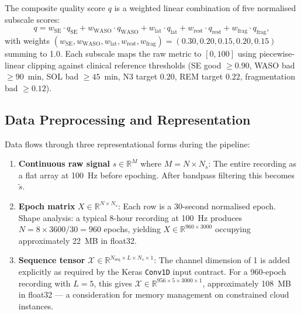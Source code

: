 \documentclass[10pt]{article}
\begin{document}
The composite quality score $q$ is a weighted linear combination of five normalised subscale scores:
\begin{equation}
  q = w_{\text{SE}} \cdot q_{\text{SE}} + w_{\text{WASO}} \cdot q_{\text{WASO}} + w_{\text{lat}} \cdot q_{\text{lat}} + w_{\text{rest}} \cdot q_{\text{rest}} + w_{\text{frag}} \cdot q_{\text{frag}},
\end{equation}
with weights $(w_{\text{SE}}, w_{\text{WASO}}, w_{\text{lat}}, w_{\text{rest}}, w_{\text{frag}}) = (0.30, 0.20, 0.15, 0.20, 0.15)$ summing to 1.0. Each subscale maps the raw metric to $[0, 100]$ using piecewise-linear clipping against clinical reference thresholds (SE good $\geq 0.90$, WASO bad $\geq 90$~min, SOL bad $\geq 45$~min, N3 target $0.20$, REM target $0.22$, fragmentation bad $\geq 0.12$).

\subsection{Data Preprocessing and Representation}
\label{sec:dataPreprocessing}

Data flows through three representational forms during the pipeline:

\begin{enumerate}
  \item \textbf{Continuous raw signal} $s \in \mathbb{R}^{M}$ where $M = N \times N_s$: The entire recording as a flat array at 100~Hz before epoching. After bandpass filtering this becomes $\tilde{s}$.
  \item \textbf{Epoch matrix} $X \in \mathbb{R}^{N \times N_s}$: Each row is a 30-second normalised epoch. Shape analysis: a typical 8-hour recording at 100~Hz produces $N = 8 \times 3600 / 30 = 960$ epochs, yielding $X \in \mathbb{R}^{960 \times 3000}$ occupying approximately 22~MB in float32.
  \item \textbf{Sequence tensor} $\mathcal{X} \in \mathbb{R}^{N_{\text{seq}} \times L \times N_s \times 1}$: The channel dimension of 1 is added explicitly as required by the Keras \texttt{Conv1D} input contract. For a 960-epoch recording with $L=5$, this gives $\mathcal{X} \in \mathbb{R}^{956 \times 5 \times 3000 \times 1}$, approximately 108~MB in float32 --- a consideration for memory management on constrained cloud instances.
\end{enumerate}
\end{document}
